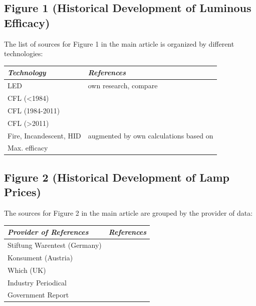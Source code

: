\documentclass[10pt]{article}
\begin{document}
\subsection{Figure 1 (Historical Development of Luminous Efficacy)}

The list of sources for Figure 1 in the main article is organized by different technologies:

\begin{table}[h!]
    \begin{tabularx}{\textwidth}{|l|X|}
    \hline
    \textit{Technology} & \textit{References} \\
    \hline
    LED & own research, compare \cite{zenodo_weinold_led_history} \\
    \hline
    CFL (<1984) & \cite{Bouwknegt1982}\cite{Vrenken1983} \\
    \hline
    CFL (1984-2011) & \cite{eger2018origin} \\
    \hline
    CFL (>2011) & \cite{Guan2015} \\
    \hline
    Fire, Incandescent, HID & \cite{azevedo2009transition} augmented by own calculations based on \cite{benesch1905beleuchtungswesen} \\
    \hline
    Max. efficacy & \cite{Murphy2012} \\
    \hline
    \end{tabularx}
\end{table}

\subsection{Figure 2 (Historical Development of Lamp Prices)}

The sources for Figure 2 in the main article are grouped by the provider of data:

\begin{table}[h!]
    \begin{tabularx}{\textwidth}{|l|X|}
    \hline
    \textit{Provider of References} & \textit{References} \\
    \hline
    Stiftung Warentest (Germany) & \cite{Warentest2008}\cite{Warentest2009_1}\cite{Warentest2009_2}\cite{Warentest2010_1}\cite{Warentest2010_2}\cite{Warentest2011}\cite{Warentest2012}\cite{Warentest2013}\cite{Warentest2014_1}\cite{Warentest2014_2}\cite{Warentest2015}\cite{Warentest2016_1}\cite{Warentest2016_2}\cite{Warentest2018} \\
    \hline
    Konsument (Austria) & \cite{Konsument2010} \\
    \hline
    Which (UK) & \cite{Which2020} \\
    \hline
    Industry Periodical & \cite{PM2020} \\
    \hline
    Government Report & \cite{council2013assessment} \\
    \hline
    \end{tabularx}
\end{table}
\end{document}
